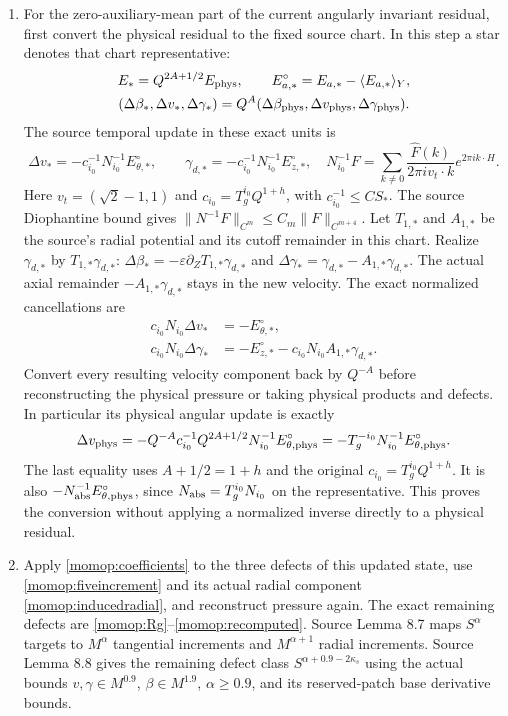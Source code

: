\begin{enumerate}
\item For the zero-auxiliary-mean part of the current angularly
invariant residual, first convert the physical residual to the fixed
source chart. In this step a star denotes that chart representative:
\[
\begin{gathered}
 E_*=Q^{2A+1/2}E_{\rm phys},\qquad
 E_{a,*}^\circ=E_{a,*}-\langle E_{a,*}\rangle_Y,\\
 (\Delta\beta_*,\Delta v_*,\Delta\gamma_*)
       =Q^A(\Delta\beta_{\rm phys},\Delta v_{\rm phys},
                                      \Delta\gamma_{\rm phys}).
\end{gathered}
\]
The source temporal update in these exact units is
\[
 \Delta v_*=-c_{i_0}^{-1}N_{i_0}^{-1}E_{\theta,*}^\circ,\qquad
 \gamma_{d,*}=-c_{i_0}^{-1}N_{i_0}^{-1}E_{z,*}^\circ,
 \quad
 N_{i_0}^{-1}F=
 \sum_{k\ne0}\frac{\widehat F(k)}{2\pi i v_t\cdot k}e^{2\pi ik\cdot H}.
\]
Here $v_t=(\sqrt2-1,1)$ and
$c_{i_0}=T_g^{i_0}Q^{1+h}$, with $c_{i_0}^{-1}\le CS_*$.
The source Diophantine bound gives
$\|N^{-1}F\|_{C^m}\le C_m\|F\|_{C^{m+4}}$.
Let $T_{1,*}$ and $A_{1,*}$ be the source's radial potential and
its cutoff remainder in this chart. Realize $\gamma_{d,*}$ by
$T_{1,*}\gamma_{d,*}$:
$\Delta\beta_*=-\varepsilon\partial_ZT_{1,*}\gamma_{d,*}$ and
$\Delta\gamma_*=\gamma_{d,*}-A_{1,*}\gamma_{d,*}$.
The actual axial remainder $-A_{1,*}\gamma_{d,*}$ stays in the
new velocity. The exact normalized cancellations are
\[
\begin{split}
 c_{i_0}N_{i_0}\Delta v_*&=-E_{\theta,*}^\circ,\\
 c_{i_0}N_{i_0}\Delta\gamma_*&=-E_{z,*}^\circ
              -c_{i_0}N_{i_0}A_{1,*}\gamma_{d,*}.
\end{split}
\]
Convert every resulting velocity component back by $Q^{-A}$ before
reconstructing the physical pressure or taking physical products and
defects. In particular its physical angular update is exactly
\[
 \Delta v_{\rm phys}
  =-Q^{-A}c_{i_0}^{-1}Q^{2A+1/2}
                     N_{i_0}^{-1}E_{\theta,\rm phys}^\circ
  =-T_g^{-i_0}N_{i_0}^{-1}E_{\theta,\rm phys}^\circ .
\]
The last equality uses $A+1/2=1+h$ and the original
$c_{i_0}=T_g^{i_0}Q^{1+h}$. It is also
$-N_{\rm abs}^{-1}E_{\theta,\rm phys}^\circ$, since
$N_{\rm abs}=T_g^{i_0}N_{i_0}$ on the representative.
This proves the conversion without applying a normalized inverse
directly to a physical residual.

\item Apply \eqref{momop:coefficients} to the three defects of this
updated state, use \eqref{momop:fiveincrement} and its actual
radial component \eqref{momop:inducedradial}, and reconstruct
pressure again. The exact remaining defects are
\eqref{momop:Rg}--\eqref{momop:recomputed}.
Source Lemma 8.7 maps $S^\alpha$ targets to $M^\alpha$
tangential increments and $M^{\alpha+1}$ radial increments.
Source Lemma 8.8 gives the remaining defect class
$S^{\alpha+0.9-2\kappa_s}$ using the actual bounds
$v,\gamma\in M^{0.9}$, $\beta\in M^{1.9}$, $\alpha\ge0.9$,
and its reserved-patch base derivative bounds.
\end{enumerate}

